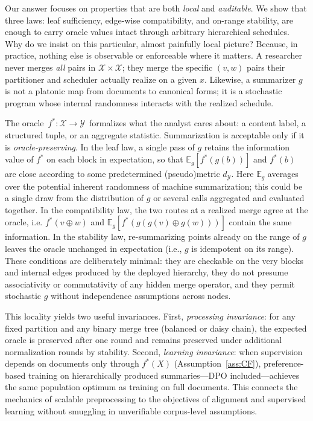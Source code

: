 \documentclass[11pt]{article}
\newcommand{\Strings}{\mathcal{X}}       %
\newcommand{\Y}{\mathcal{Y}}               %
\newcommand{\fstar}{f^*}               %
\newcommand{\E}{\mathbb{E}}
\newcommand{\concat}{\oplus}                    %
\newcommand{\metric}{d_{\Y}}
\newcommand{\Eg}{\E_g}     %
\begin{document}
Our answer focuses on properties that are both \emph{local} and \emph{auditable}. 
We show that three laws: leaf sufficiency, edge-wise compatibility, and on-range stability, are enough to carry oracle values intact through arbitrary hierarchical schedules. Why do we insist on this particular, almost painfully local picture? Because, in practice, nothing else is observable or enforceable where it matters. A researcher never merges \emph{all} pairs in $\Strings\times\Strings$; they merge the specific $(v,w)$ pairs their partitioner and scheduler actually realize on a given $x$. Likewise, a summarizer $g$ is not a platonic map from documents to canonical forms; it is a stochastic program whose internal randomness interacts with the realized schedule. 

The oracle $\,\fstar:\Strings\!\to\!\Y\,$ formalizes what the analyst cares about: a content label, a structured tuple, or an aggregate statistic. Summarization is acceptable only if it is \emph{oracle-preserving}. In the leaf law, a single pass of $g$ retains the information value of $\fstar$ on each block in expectation, so that $\Eg[\fstar(g(b))]$ and $\fstar(b)$ are close according to some predetermined (pseudo)metric $\metric$. Here $\Eg$ averages over the potential inherent randomness of machine summarization; this could be a single draw from the distribution of $g$ or several calls aggregated and evaluated together. In the compatibility law, the two routes at a realized merge agree at the oracle, i.e. $\fstar(v\concat w)$ and $\Eg[\fstar(g(g(v)\concat g(w)))]$ contain the same information. In the stability law, re-summarizing points already on the range of $g$ leaves the oracle unchanged in expectation (i.e., $g$ is idempotent on its range). These conditions are deliberately minimal: they are checkable on the very blocks and internal edges produced by the deployed hierarchy, they do not presume associativity or commutativity of any hidden merge operator, and they permit stochastic $g$ without independence assumptions across nodes.

This locality yields two useful invariances. First, \emph{processing invariance}: for any fixed partition and any binary merge tree (balanced or daisy chain), the expected oracle is preserved after one round and remains preserved under additional normalization rounds by stability. Second, \emph{learning invariance}: when supervision depends on documents only through $\fstar(X)$ (Assumption~\ref{ass:CF}), preference-based training on hierarchically produced summaries—DPO included—achieves the same population optimum as training on full documents. This connects the mechanics of scalable preprocessing to the objectives of alignment and supervised learning without smuggling in unverifiable corpus-level assumptions.
\end{document}
